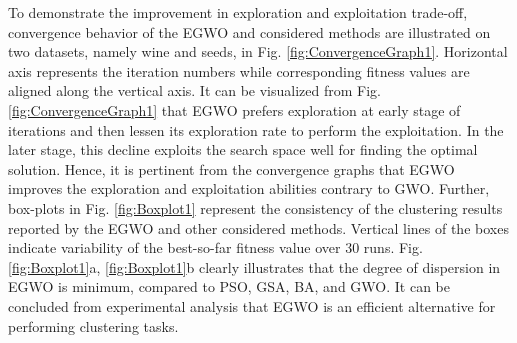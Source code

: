\documentclass[review]{elsarticle}
\begin{document}
    To  demonstrate the improvement  in exploration and exploitation trade-off, convergence behavior of the EGWO and considered methods are illustrated  on two datasets, namely wine and seeds, in Fig. \ref{fig:ConvergenceGraph1}. Horizontal axis represents the iteration numbers while corresponding fitness values are aligned along the  vertical axis. It can be visualized from Fig. \ref{fig:ConvergenceGraph1} that EGWO prefers exploration at early stage of iterations and then lessen its exploration rate to perform the exploitation. In the later stage, this decline exploits the search space well for finding the optimal solution. Hence, it is pertinent from the convergence graphs that EGWO improves the exploration and exploitation abilities contrary to GWO. Further, box-plots in Fig. \ref{fig:Boxplot1} represent the consistency of the clustering results reported by the EGWO and other considered methods. Vertical lines of the boxes indicate variability of the best-so-far fitness value over 30 runs. Fig. \ref{fig:Boxplot1}a, \ref{fig:Boxplot1}b clearly illustrates that the degree of dispersion in EGWO is minimum, compared to PSO, GSA, BA, and GWO. It can be concluded from experimental analysis that EGWO is an efficient alternative for performing clustering tasks.
\end{document}
